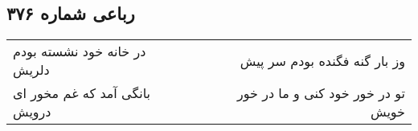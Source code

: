 \begin{center}
\section*{رباعی شماره ۳۷۶}
\label{sec:sh376}
\begin{longtable}{l p{0.5cm} r}
در خانه خود نشسته بودم دلریش
&&
وز بار گنه فگنده بودم سر پیش
\\
بانگی آمد که غم مخور ای درویش
&&
تو در خور خود کنی و ما در خور خویش
\\
\end{longtable}
\end{center}
